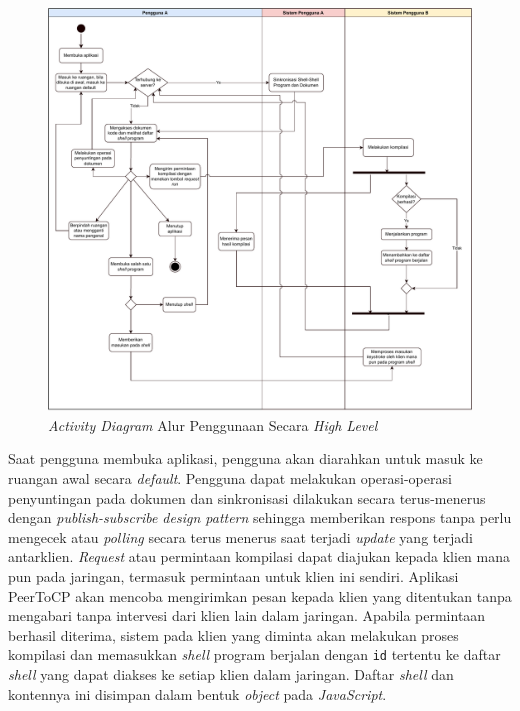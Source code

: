 \begin{figure}
    \centering
    \includegraphics[scale=0.5]{assets/skripsi/Activity_Diagram}
    \caption{\textit{Activity Diagram} Alur Penggunaan Secara \textit{High Level}}
    \label{fig:activity}
\end{figure}

Saat pengguna membuka aplikasi, pengguna akan diarahkan untuk masuk ke ruangan awal secara \textit{default}. Pengguna dapat melakukan operasi-operasi penyuntingan pada dokumen dan sinkronisasi dilakukan secara terus-menerus dengan \textit{publish-subscribe design pattern} sehingga memberikan respons tanpa perlu mengecek atau \textit{polling} secara terus menerus saat terjadi \textit{update} yang terjadi antarklien. \textit{Request} atau permintaan kompilasi dapat diajukan kepada klien mana pun pada jaringan, termasuk permintaan untuk klien ini sendiri. Aplikasi PeerToCP akan mencoba mengirimkan pesan kepada klien yang ditentukan tanpa mengabari tanpa intervesi dari klien lain dalam jaringan. Apabila permintaan berhasil diterima, sistem pada klien yang diminta akan melakukan proses kompilasi dan memasukkan \textit{shell} program berjalan dengan \texttt{id} tertentu ke daftar \textit{shell} yang dapat diakses ke setiap klien dalam jaringan. Daftar \textit{shell} dan kontennya ini disimpan dalam bentuk \textit{object} pada \textit{JavaScript}.

